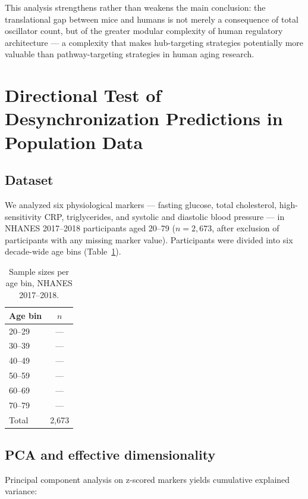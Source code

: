 \documentclass[12pt]{article}
\begin{document}
This analysis strengthens rather than weakens the main conclusion: the
translational gap between mice and humans is not merely a consequence of
total oscillator count, but of the greater modular complexity of human
regulatory architecture — a complexity that makes hub-targeting strategies
potentially more valuable than pathway-targeting strategies in human aging
research.

\section{Directional Test of Desynchronization Predictions in Population Data}
\label{app:nhanes}

\subsection{Dataset}

We analyzed six physiological markers — fasting glucose, total cholesterol,
high-sensitivity CRP, triglycerides, and systolic and diastolic blood pressure
— in NHANES 2017--2018 participants aged 20--79 ($n = 2{,}673$, after exclusion
of participants with any missing marker value). Participants were divided into
six decade-wide age bins (Table~\ref{tab:nhanes}).

\begin{table}[h]
\centering
\caption{Sample sizes per age bin, NHANES 2017--2018.}
\label{tab:nhanes}
\begin{tabular}{lc}
\toprule
Age bin & $n$ \\
\midrule
20--29 & — \\
30--39 & — \\
40--49 & — \\
50--59 & — \\
60--69 & — \\
70--79 & — \\
\hline
Total & 2,673 \\
\bottomrule
\end{tabular}
\end{table}

\subsection{PCA and effective dimensionality}

Principal component analysis on z-scored markers yields cumulative explained
variance:
\begin{equation}
[0.300,\ 0.486,\ 0.662,\ 0.811,\ \mathbf{0.915},\ 1.000]
\end{equation}
\end{document}
